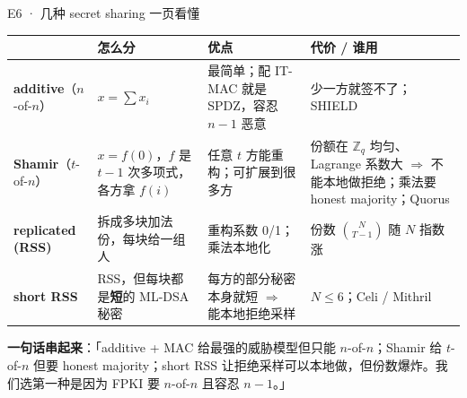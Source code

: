 \documentclass[aspectratio=169,10pt,fontset=none]{ctexbeamer}
\begin{document}
\begin{frame}{E6 · 几种 secret sharing 一页看懂}
{\scriptsize\renewcommand{\arraystretch}{1.25}
\begin{tabularx}{\textwidth}{@{}p{2.6cm}YYp{3.2cm}@{}}\toprule
 & 怎么分 & 优点 & 代价 / 谁用 \\\midrule
\textbf{additive}（$n$-of-$n$）& $x=\sum x_i$ & 最简单；配 IT-MAC 就是 SPDZ，容忍 $n-1$ 恶意 & 少一方就签不了；SHIELD \\
\textbf{Shamir}（$t$-of-$n$）& $x=f(0)$，$f$ 是 $t-1$ 次多项式，各方拿 $f(i)$ & 任意 $t$ 方能重构；可扩展到很多方 & 份额在 $\mathbb Z_q$ 均匀、Lagrange 系数大 $\Rightarrow$ 不能本地做拒绝；乘法要 honest majority；Quorus \\
\textbf{replicated (RSS)} & 拆成多块加法份，每块给一组人 & 重构系数 0/1；乘法本地化 & 份数 $\binom{N}{T-1}$ 随 $N$ 指数涨 \\
\textbf{short RSS} & RSS，但每块都是\textbf{短}的 ML-DSA 秘密 & 每方的部分秘密本身就短 $\Rightarrow$ 能本地拒绝采样 & $N\le6$；Celi / Mithril \\\bottomrule
\end{tabularx}}
\vspace{.5em}

\textbf{一句话串起来}：「additive + MAC 给最强的威胁模型但只能 $n$-of-$n$；Shamir 给 $t$-of-$n$ 但要 honest majority；short RSS 让拒绝采样可以本地做，但份数爆炸。我们选第一种是因为 FPKI 要 $n$-of-$n$ 且容忍 $n-1$。」
\end{frame}
\end{document}
